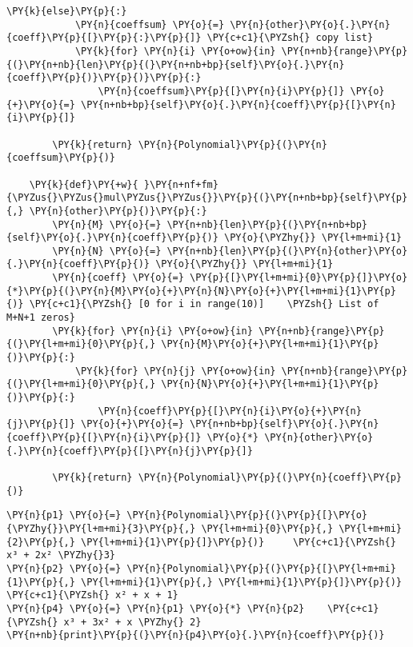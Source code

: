 \begin{example}
\begin{tcolorbox}[breakable, size=fbox, boxrule=1pt, pad at break*=1mm,colback=cellbackground, colframe=cellborder]
\begin{Verbatim}[commandchars=\\\{\}]
        \PY{k}{else}\PY{p}{:} 
            \PY{n}{coeffsum} \PY{o}{=} \PY{n}{other}\PY{o}{.}\PY{n}{coeff}\PY{p}{[}\PY{p}{:}\PY{p}{]} \PY{c+c1}{\PYZsh{} copy list}
            \PY{k}{for} \PY{n}{i} \PY{o+ow}{in} \PY{n+nb}{range}\PY{p}{(}\PY{n+nb}{len}\PY{p}{(}\PY{n+nb+bp}{self}\PY{o}{.}\PY{n}{coeff}\PY{p}{)}\PY{p}{)}\PY{p}{:}
                \PY{n}{coeffsum}\PY{p}{[}\PY{n}{i}\PY{p}{]} \PY{o}{+}\PY{o}{=} \PY{n+nb+bp}{self}\PY{o}{.}\PY{n}{coeff}\PY{p}{[}\PY{n}{i}\PY{p}{]}
            
        \PY{k}{return} \PY{n}{Polynomial}\PY{p}{(}\PY{n}{coeffsum}\PY{p}{)}

    \PY{k}{def}\PY{+w}{ }\PY{n+nf+fm}{\PYZus{}\PYZus{}mul\PYZus{}\PYZus{}}\PY{p}{(}\PY{n+nb+bp}{self}\PY{p}{,} \PY{n}{other}\PY{p}{)}\PY{p}{:}
        \PY{n}{M} \PY{o}{=} \PY{n+nb}{len}\PY{p}{(}\PY{n+nb+bp}{self}\PY{o}{.}\PY{n}{coeff}\PY{p}{)} \PY{o}{\PYZhy{}} \PY{l+m+mi}{1}
        \PY{n}{N} \PY{o}{=} \PY{n+nb}{len}\PY{p}{(}\PY{n}{other}\PY{o}{.}\PY{n}{coeff}\PY{p}{)} \PY{o}{\PYZhy{}} \PY{l+m+mi}{1}
        \PY{n}{coeff} \PY{o}{=} \PY{p}{[}\PY{l+m+mi}{0}\PY{p}{]}\PY{o}{*}\PY{p}{(}\PY{n}{M}\PY{o}{+}\PY{n}{N}\PY{o}{+}\PY{l+m+mi}{1}\PY{p}{)} \PY{c+c1}{\PYZsh{} [0 for i in range(10)]    \PYZsh{} List of M+N+1 zeros}
        \PY{k}{for} \PY{n}{i} \PY{o+ow}{in} \PY{n+nb}{range}\PY{p}{(}\PY{l+m+mi}{0}\PY{p}{,} \PY{n}{M}\PY{o}{+}\PY{l+m+mi}{1}\PY{p}{)}\PY{p}{:} 
            \PY{k}{for} \PY{n}{j} \PY{o+ow}{in} \PY{n+nb}{range}\PY{p}{(}\PY{l+m+mi}{0}\PY{p}{,} \PY{n}{N}\PY{o}{+}\PY{l+m+mi}{1}\PY{p}{)}\PY{p}{:}
                \PY{n}{coeff}\PY{p}{[}\PY{n}{i}\PY{o}{+}\PY{n}{j}\PY{p}{]} \PY{o}{+}\PY{o}{=} \PY{n+nb+bp}{self}\PY{o}{.}\PY{n}{coeff}\PY{p}{[}\PY{n}{i}\PY{p}{]} \PY{o}{*} \PY{n}{other}\PY{o}{.}\PY{n}{coeff}\PY{p}{[}\PY{n}{j}\PY{p}{]}
        
        \PY{k}{return} \PY{n}{Polynomial}\PY{p}{(}\PY{n}{coeff}\PY{p}{)}
\end{Verbatim}
\end{tcolorbox}

    \begin{tcolorbox}[breakable, size=fbox, boxrule=1pt, pad at break*=1mm,colback=cellbackground, colframe=cellborder]
\begin{Verbatim}[commandchars=\\\{\}]
\PY{n}{p1} \PY{o}{=} \PY{n}{Polynomial}\PY{p}{(}\PY{p}{[}\PY{o}{\PYZhy{}}\PY{l+m+mi}{3}\PY{p}{,} \PY{l+m+mi}{0}\PY{p}{,} \PY{l+m+mi}{2}\PY{p}{,} \PY{l+m+mi}{1}\PY{p}{]}\PY{p}{)}     \PY{c+c1}{\PYZsh{} x³ + 2x² \PYZhy{}3}
\PY{n}{p2} \PY{o}{=} \PY{n}{Polynomial}\PY{p}{(}\PY{p}{[}\PY{l+m+mi}{1}\PY{p}{,} \PY{l+m+mi}{1}\PY{p}{,} \PY{l+m+mi}{1}\PY{p}{]}\PY{p}{)}        \PY{c+c1}{\PYZsh{} x² + x + 1}
\PY{n}{p4} \PY{o}{=} \PY{n}{p1} \PY{o}{*} \PY{n}{p2}    \PY{c+c1}{\PYZsh{} x³ + 3x² + x \PYZhy{} 2}
\PY{n+nb}{print}\PY{p}{(}\PY{n}{p4}\PY{o}{.}\PY{n}{coeff}\PY{p}{)}
\end{Verbatim}
\end{tcolorbox}


\end{example}
